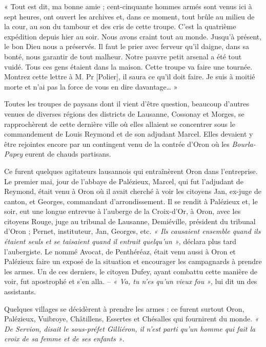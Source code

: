 \documentclass[french,twoside]{book} %
\newenvironment{quoteblock}%
  {\begin{quoting}}
  {\end{quoting}}
\newenvironment{quotebar}{%
    \def\FrameCommand{{\color{rubric!10!}\vrule width 0.5em} \hspace{0.9em}}%
    \def\OuterFrameSep{\itemsep} %
    \MakeFramed {\advance\hsize-\width \FrameRestore}
  }%
  {%
    \endMakeFramed
  }
\renewenvironment{quoteblock}%
  {%
    \savenotes
    \setstretch{0.9}
    \begin{quotebar}
  }
  {%
    \end{quotebar}
    \spewnotes
  }
\begin{document}
\begin{quoteblock}
 \noindent « Tout est dit, ma bonne amie ; cent-cinquante hommes armés sont venus ici à sept heures, ont ouvert les archives et, dans ce moment, tout brûle au milieu de la cour, au son du tambour et des cris de cette troupe. C’est la quatrième expédition depuis hier au soir. Nous avons craint tout au monde. Jusqu’à présent, le bon Dieu nous a préservés. Il faut le prier avec ferveur qu’il daigne, dans sa bonté, nous garantir de tout malheur. Notre pauvre petit arsenal a été tout vuidé. Tous ces gens étaient dans la maison. Cette troupe va faire une tournée. Montrez cette lettre à M. Pr [Polier], il saura ce qu’il doit faire. Je suis à moitié morte et n’ai pas la force de vous en dire davantage… »
 \end{quoteblock}

\noindent Toutes les troupes de paysans dont il vient d’être question, beaucoup d’autres venues de diverses régions des districts de Lausanne, Cossonay et Morges, se rapprochèrent de cette dernière ville où elles allaient se concentrer sous le commandement de Louis Reymond et de son adjudant Marcel. Elles devaient y être rejointes encore par un contingent venu de la contrée d’Oron où les \emph{Bourla-Papey} eurent de chauds partisans.\par
Ce furent quelques agitateurs lausannois qui entraînèrent Oron dans l’entreprise. Le premier mai, jour de l’abbaye de Palézieux, Marcel, qui fut l’adjudant de Reymond, était venu à Oron où il avait cherché à voir les citoyens Jan, ex-juge de canton, et Georges, commandant d’arrondissement. Il se rendit à Palézieux et, le soir, eut une longue entrevue à l’auberge de la Croix-d’Or, à Oron, avec les citoyens Rouge, juge au tribunal de Lausanne, Demiéville, président du tribunal d’Oron ; Pernet, instituteur, Jan, Georges, etc. \emph{« Ils causaient ensemble quand ils étaient seuls et se taisaient quand il entrait quelqu’un »}, déclara plus tard l’aubergiste. Le nommé Avocat, de Penthéréaz, était venu aussi à Oron et Palézieux faire un exposé de la situation et encourager les campagnards à prendre les armes. Un de ces derniers, le citoyen Dufey, ayant combattu cette manière de voir, fut apostrophé et s’en alla. – \emph{« Va, tu n’es qu’un vieux fou »}, lui dit un des assistants.\par
Quelques villages se décidèrent à prendre les armes : ce furent surtout Oron, Palézieux, Vuibroye, Châtillens, Essertes et Chésalles qui fournirent du monde. \emph{« De Servion, disait le sous-préfet Gilliéron, il n’est parti qu’un homme qui fait la croix de sa femme et de ses enfants »}.\par
\end{document}
